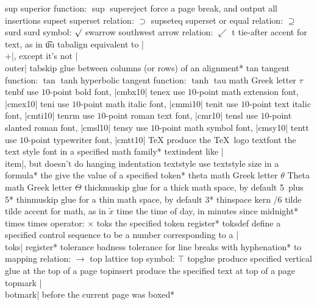 \capcs sup {superior function: $\sup$}{}{}
\capcs supereject {force a page break, and output all insertions}{}{}
\capcs supset {superset relation: $\supset$}{}{}
\capcs supseteq {superset or equal relation: $\supseteq$}{}{}
\capcs surd {surd symbol: $\surd$}{}{}
\capcs swarrow {southwest arrow relation: $\swarrow$}{}{}
\capcs t {tie-after accent for text, as in \t uu}{}{}
\capcs tabalign {equivalent to |\\+|, except it's not |\\outer|}{}{}
\capcs tabskip {glue between columns (or rows) of an alignment}*{}
\capcs tan {tangent function: $\tan$}{}{}
\capcs tanh {hyperbolic tangent function: $\tanh$}{}{}
\capcs tau {math Greek letter $\tau$}{}{}
\capcs tenbf {use $10$-point bold font, |cmbx10|}{}{}
\capcs tenex {use $10$-point math extension font, |cmex10|}{}{}
\capcs teni {use $10$-point math italic font, |cmmi10|}{}{}
\capcs tenit {use $10$-point text italic font, |cmti10|}{}{}
\capcs tenrm {use $10$-point roman text font, |cmr10|}{}{}
\capcs tensl {use $10$-point slanted roman font, |cmsl10|}{}{}
\capcs tensy {use $10$-point math symbol font, |cmsy10|}{}{}
\capcs tentt {use $10$-point typewriter font, |cmtt10|}{}{}
\capcs TeX {produce the \TeX\ logo}{}{}
\capcs textfont {the text style font in a specified math family}*{}
\capcs textindent {like |\\item|, but doesn't do hanging indentation}{}{}
\capcs textstyle {use textstyle size in a formula}*{}
\capcs the {give the value of a specified token}*{}
\capcs theta {math Greek letter $\theta$}{}{}
\capcs Theta {math Greek letter $\Theta$}{}{}
\capcs thickmuskip {glue for a thick math space, by default 5\mud\ plus 5\mud}*{}
\capcs thinmuskip {glue for a thin math space, by default 3\mud}*{}
\capcs thinspace {kern /6\em}{}{}
\capcs tilde {tilde accent for math, as in $\tilde x$}{}{}
\capcs time {the time of day, in minutes since midnight}*{}
\capcs times {times operator: $\times$}{}{}
\capcs toks {the specified token register}*{}
\capcs toksdef {define a specified control sequence to be a number
   corresponding to a |\\toks| register}*{}
\capcs tolerance {badness tolerance for line breaks with hyphenation}*{}
\capcs to {mapping relation: $\to$}{}{}
\capcs top {lattice top symbol: $\top$}{}{}
\capcs topglue {produce specified vertical glue at the
   top of a page}{}{}
\capcs topinsert {produce the specified text at top of a page}{}{}
\capcs topmark {|\\botmark| before the current page was boxed}*{}
